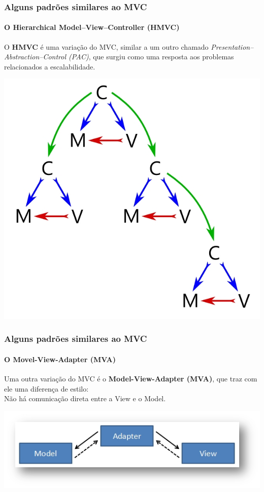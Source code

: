 \documentclass{beamer}
\begin{document}
\begin{frame}
\frametitle{Alguns padrões similares ao MVC}
\framesubtitle{O Hierarchical Model–View–Controller (HMVC)}
	O \textbf{HMVC} é uma variação do MVC, similar a um outro chamado \textit{Presentation–Abstraction–Control (PAC)}, que surgiu como uma resposta aos problemas
	relacionados a escalabilidade.
	\begin{center}
		\includegraphics[scale=0.2]{HMVC.jpg}
	\end{center}
\end{frame}

\begin{frame}
\frametitle{Alguns padrões similares ao MVC}
\framesubtitle{O Movel-View-Adapter (MVA)}
	Uma outra variação do MVC é o \textbf{Model-View-Adapter (MVA)}, que traz com ele uma diferença de estilo:\\
	Não há comunicação direta entre a View e o Model.
	\begin{center}
		\includegraphics[scale=0.4]{MVA.jpg}
	\end{center}
\end{frame}
\end{document}
